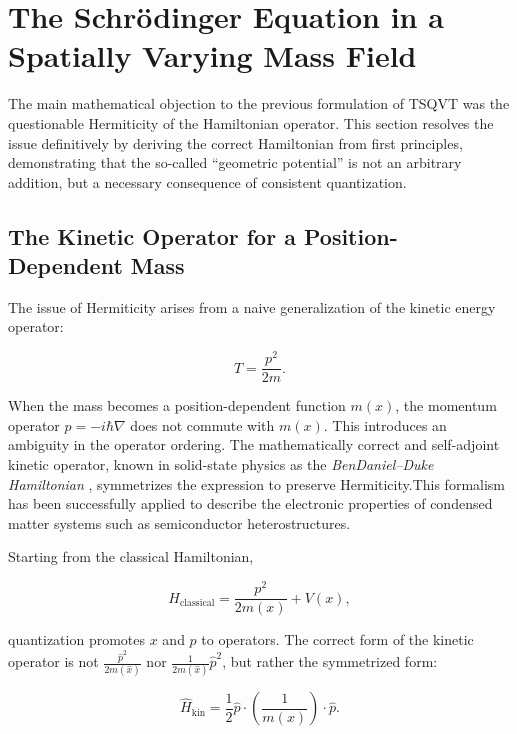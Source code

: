\documentclass[a4paper]{article}
\begin{document}
\section{The Schrödinger Equation in a Spatially Varying Mass Field}

The main mathematical objection to the previous formulation of TSQVT was the questionable Hermiticity of the Hamiltonian operator. This section resolves the issue definitively by deriving the correct Hamiltonian from first principles, demonstrating that the so-called ``geometric potential'' is not an arbitrary addition, but a necessary consequence of consistent quantization.

\subsection{The Kinetic Operator for a Position-Dependent Mass}

The issue of Hermiticity arises from a naive generalization of the kinetic energy operator:

\begin{equation}
	T = \frac{p^2}{2m}.
\end{equation}

When the mass becomes a position-dependent function \( m(x) \), the momentum operator \( \hat{p} = -i\hbar \nabla \) does not commute with \( m(x) \). This introduces an ambiguity in the operator ordering. The mathematically correct and self-adjoint kinetic operator, known in solid-state physics as the \textit{BenDaniel–Duke Hamiltonian} \cite{BenDaniel1966}, symmetrizes the expression to preserve Hermiticity.This formalism has been successfully applied to describe the electronic properties of condensed matter systems such as semiconductor heterostructures.

Starting from the classical Hamiltonian,

\begin{equation}
	H_{\text{classical}} = \frac{p^2}{2m(x)} + V(x),
\end{equation}

quantization promotes \( x \) and \( p \) to operators. The correct form of the kinetic operator is not \( \frac{\hat{p}^2}{2m(\hat{x})} \) nor \( \frac{1}{2m(\hat{x})} \hat{p}^2 \), but rather the symmetrized form:

\begin{equation}
	\hat{H}_{\text{kin}} = \frac{1}{2} \hat{p} \cdot \left( \frac{1}{m(x)} \right) \cdot \hat{p}.
\end{equation}
\end{document}
